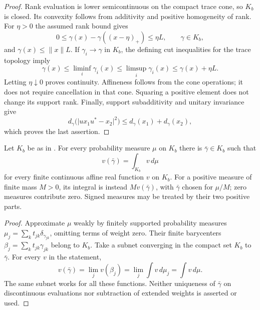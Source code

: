 \begin{proof}
Rank evaluation is lower semicontinuous on the compact trace cone, so
$K_b$ is closed.  Its convexity follows from additivity and positive
homogeneity of rank.  For $\eta>0$ the assumed rank bound gives
\begin{equation}\label{un:cut-loss}
 0\leq\gamma(x)-\gamma((x-\eta)_+)\leq\eta L,
 \qquad \gamma\in K_b,
\end{equation}
and $\gamma(x)\leq\|x\|L$.  If $\gamma_i\to\gamma$ in $K_b$, the
defining cut inequalities for the trace topology imply
\[
 \gamma(x)\leq\liminf_i\gamma_i(x)
 \leq\limsup_i\gamma_i(x)
 \leq\gamma(x)+\eta L.
\]
Letting $\eta\downarrow0$ proves continuity.  Affineness follows from
the cone operations; it does not require cancellation in that cone.
Squaring a positive element does not change its support rank.  Finally,
support subadditivity and unitary invariance give
\[
 d_\gamma\bigl(\lvert u x_1u^*-x_2\rvert^2\bigr)
 \leq d_\gamma(x_1)+d_\gamma(x_2),
\]
which proves the last assertion.
\end{proof}

\begin{lemma}\label{un:barycenter}
Let $K_b$ be as in .  For every probability measure
$\mu$ on $K_b$ there is $\bar\gamma\in K_b$ such that
\begin{equation}\label{un:barycenter-formula}
 v(\bar\gamma)=\int_{K_b}v\,d\mu
\end{equation}
for every finite continuous affine real function $v$ on $K_b$.
For a positive measure of finite mass $M>0$, its integral is instead
$M v(\bar\gamma)$, with $\bar\gamma$ chosen for $\mu/M$; zero measures
contribute zero.  Signed measures may be treated by their two positive
parts.
\end{lemma}

\begin{proof}
Approximate $\mu$ weakly by finitely supported probability measures
$\mu_j=\sum_k t_{jk}\delta_{\gamma_{jk}}$, omitting terms of weight
zero.  Their finite barycenters
$\beta_j=\sum_k t_{jk}\gamma_{jk}$ belong to $K_b$.  Take a subnet
converging in the compact set $K_b$ to $\bar\gamma$.  For every $v$ in
the statement,
\[
 v(\bar\gamma)=\lim_jv(\beta_j)
 =\lim_j\int v\,d\mu_j=\int v\,d\mu.
\]
The same subnet works for all these functions.  Neither uniqueness of
$\bar\gamma$ on discontinuous evaluations nor subtraction of extended
weights is asserted or used.
\end{proof}

